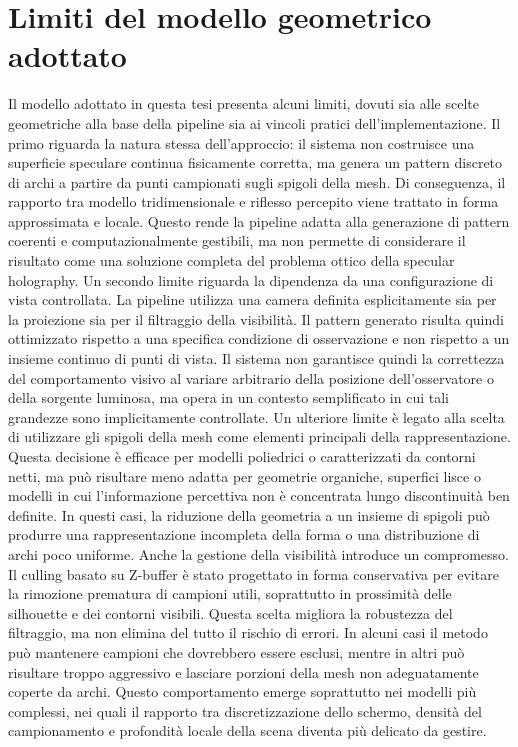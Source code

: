 \documentclass[a4paper,11pt,titlepage,twoside]{book}
\newcommand{\1}{\mathbf{1}}
\numberwithin{equation}{chapter}
\theoremstyle{plain}
\theoremstyle{definition}
\begin{document}
	\section{Limiti del modello geometrico adottato}
	
	Il modello adottato in questa tesi presenta alcuni limiti, dovuti sia alle scelte geometriche alla base della pipeline sia ai vincoli pratici dell’implementazione. Il primo riguarda la natura stessa dell’approccio: il sistema non costruisce una superficie speculare continua fisicamente corretta, ma genera un pattern discreto di archi a partire da punti campionati sugli spigoli della mesh. Di conseguenza, il rapporto tra modello tridimensionale e riflesso percepito viene trattato in forma approssimata e locale. Questo rende la pipeline adatta alla generazione di pattern coerenti e computazionalmente gestibili, ma non permette di considerare il risultato come una soluzione completa del problema ottico della specular holography.
	Un secondo limite riguarda la dipendenza da una configurazione di vista controllata. La pipeline utilizza una camera definita esplicitamente sia per la proiezione sia per il filtraggio della visibilità. Il pattern generato risulta quindi ottimizzato rispetto a una specifica condizione di osservazione e non rispetto a un insieme continuo di punti di vista. Il sistema non garantisce quindi la correttezza del comportamento visivo al variare arbitrario della posizione dell’osservatore o della sorgente luminosa, ma opera in un contesto semplificato in cui tali grandezze sono implicitamente controllate.
	Un ulteriore limite è legato alla scelta di utilizzare gli spigoli della mesh come elementi principali della rappresentazione. Questa decisione è efficace per modelli poliedrici o caratterizzati da contorni netti, ma può risultare meno adatta per geometrie organiche, superfici lisce o modelli in cui l’informazione percettiva non è concentrata lungo discontinuità ben definite. In questi casi, la riduzione della geometria a un insieme di spigoli può produrre una rappresentazione incompleta della forma o una distribuzione di archi poco uniforme.
	Anche la gestione della visibilità introduce un compromesso. Il culling basato su Z-buffer è stato progettato in forma conservativa per evitare la rimozione prematura di campioni utili, soprattutto in prossimità delle silhouette e dei contorni visibili. Questa scelta migliora la robustezza del filtraggio, ma non elimina del tutto il rischio di errori. In alcuni casi il metodo può mantenere campioni che dovrebbero essere esclusi, mentre in altri può risultare troppo aggressivo e lasciare porzioni della mesh non adeguatamente coperte da archi. Questo comportamento emerge soprattutto nei modelli più complessi, nei quali il rapporto tra discretizzazione dello schermo, densità del campionamento e profondità locale della scena diventa più delicato da gestire.
\end{document}
